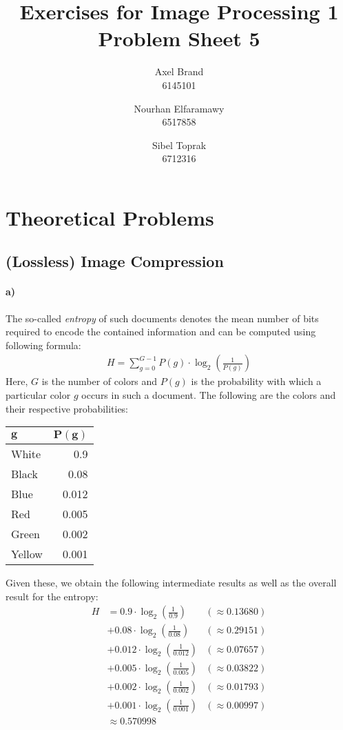 \documentclass[a4paper,twocolumn]{article}
\title{\textbf{Exercises for Image Processing 1}\\Problem Sheet 5}
\author{Axel Brand\\6145101 \and Nourhan Elfaramawy\\6517858 \and Sibel Toprak\\6712316}
\begin{document}
	\maketitle
	
	\section{Theoretical Problems}
	
	\subsection{(Lossless) Image Compression}
	
	\paragraph{a)} %
	The so-called \textit{entropy} of such documents denotes the mean number of bits required to encode the contained information and can be computed using following formula:
	\begin{align*}
	H = \sum_{g=0}^{G-1} P(g) \cdot \log_{2}\left(\frac{1}{P(g)}\right)
	\end{align*}
	Here, $G$ is the number of colors and $P(g)$ is the probability with which a particular color $g$ occurs in such a document. The following are the colors and their respective probabilities:
	\begin{center}
		\begin{tabular}{l r}
			$\mathbf{g}$ & $\mathbf{P(g)}$ \\
			\hline
			White  & 0.9   \\
			Black  & 0.08  \\
			Blue   & 0.012 \\
			Red    & 0.005 \\
			Green  & 0.002 \\
			Yellow & 0.001 \\
		\end{tabular}
	\end{center}
	Given these, we obtain the following intermediate results as well as the overall result for the entropy:
	\begin{align*}
	H
	&= 0.9 \cdot \log_{2}\left(\frac{1}{0.9}\right)
	&(\approx 0.13680) \\
	&+ 0.08 \cdot \log_{2}\left(\frac{1}{0.08}\right)
	&(\approx 0.29151) \\
	&+ 0.012 \cdot \log_{2}\left(\frac{1}{0.012}\right)
	&(\approx 0.07657) \\
	&+ 0.005 \cdot \log_{2}\left(\frac{1}{0.005}\right)
	&(\approx 0.03822) \\
	&+ 0.002 \cdot \log_{2}\left(\frac{1}{0.002}\right)
	&(\approx 0.01793) \\
	&+ 0.001 \cdot \log_{2}\left(\frac{1}{0.001}\right)
	&(\approx 0.00997) \\
	&\approx 0.570998
	\end{align*}
	
\end{document}
